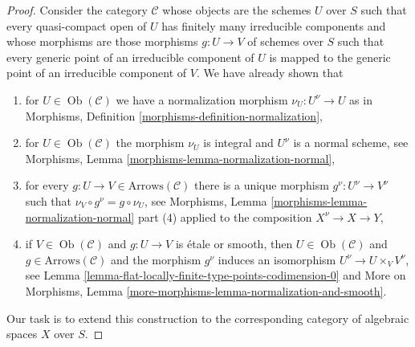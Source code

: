 \documentclass{stacks-project}
\theoremstyle{plain}
\theoremstyle{definition}
\theoremstyle{remark}
\numberwithin{equation}{subsection}
\def\Ob{\mathop{\mathrm{Ob}}\nolimits}
\begin{document}
\begin{proof}
Consider the category $\mathcal{C}$ whose objects are the
schemes $U$ over $S$ such that every quasi-compact open of
$U$ has finitely many irreducible components and whose morphisms
are those morphisms $g : U \to V$ of schemes over $S$ such
that every generic point of an irreducible component of $U$
is mapped to the generic point of an irreducible component of $V$.
We have already shown that
\begin{enumerate}
\item[(a)] for $U \in \Ob(\mathcal{C})$ we have a
normalization morphism $\nu_U : U^\nu \to U$ as in
Morphisms, Definition \ref{morphisms-definition-normalization},
\item[(b)] for $U \in \Ob(\mathcal{C})$ the morphism $\nu_U$
is integral and $U^\nu$ is a normal scheme, see
Morphisms, Lemma \ref{morphisms-lemma-normalization-normal},
\item[(c)] for every $g : U \to V \in \text{Arrows}(\mathcal{C})$
there is a unique morphism $g^\nu : U^\nu \to V^\nu$
such that $\nu_V \circ g^\nu = g \circ \nu_U$, see
Morphisms, Lemma \ref{morphisms-lemma-normalization-normal}
part (4) applied to the composition $X^\nu \to X \to Y$,
\item[(d)] if $V \in \Ob(\mathcal{C})$ and $g : U \to V$ is
\'etale or smooth, then $U \in \Ob(\mathcal{C})$ and
$g \in \text{Arrows}(\mathcal{C})$ and the morphism $g^\nu$
induces an isomorphism $U^\nu \to U \times_V V^\nu$, see
Lemma \ref{lemma-flat-locally-finite-type-points-codimension-0}
and More on Morphisms, Lemma
\ref{more-morphisms-lemma-normalization-and-smooth}.
\end{enumerate}
Our task is to extend this construction to the corresponding
category of algebraic spaces $X$ over $S$.


\end{proof}
\end{document}

